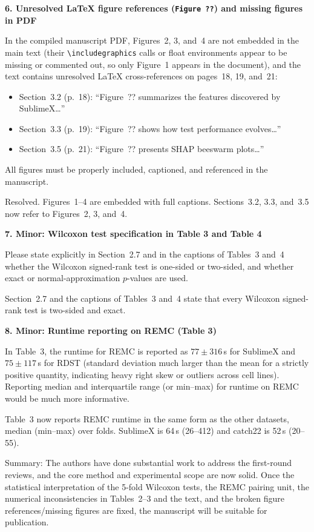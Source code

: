 \documentclass[11pt]{article}
\makeatletter
\newcommand{\rsp}{\par\vspace{0.9em}}
\newcommand{\rc}[1]{\begin{reviewerbox}#1\end{reviewerbox}}
\newcommand{\rcitem}[2]{\begin{reviewerbox}\textbf{#1}\par\smallskip#2\end{reviewerbox}}
\newcommand{\response}[2]{%
  \begin{responsebox}#1%
  \def\@responseitems{#2}%
  \ifx\@responseitems\empty\else\begin{itemize}[nosep,leftmargin=1.2em]#2\end{itemize}\fi
  \end{responsebox}\rsp}
\makeatother
\begin{document}
\rcitem{6. Unresolved LaTeX figure references (\texttt{Figure ??}) and missing figures in PDF}{In the compiled manuscript PDF, Figures~2, 3, and~4 are not embedded in the main text (their \texttt{\textbackslash includegraphics} calls or float environments appear to be missing or commented out, so only Figure~1 appears in the document), and the text contains unresolved LaTeX cross-references on pages~18, 19, and~21:
\begin{itemize}[nosep,leftmargin=1.4em]
  \item Section~3.2 (p.~18): ``Figure~?? summarizes the features discovered by SublimeX\ldots''
  \item Section~3.3 (p.~19): ``Figure~?? shows how test performance evolves\ldots''
  \item Section~3.5 (p.~21): ``Figure~?? presents SHAP beeswarm plots\ldots''
\end{itemize}
All figures must be properly included, captioned, and referenced in the manuscript.}

\response{Resolved. Figures~1--4 are embedded with full captions. Sections~3.2, 3.3, and~3.5 now refer to Figures~2, 3, and~4.}{}

\rcitem{7. Minor: Wilcoxon test specification in Table 3 and Table 4}{Please state explicitly in Section~2.7 and in the captions of Tables~3 and~4 whether the Wilcoxon signed-rank test is one-sided or two-sided, and whether exact or normal-approximation $p$-values are used.}

\response{Section~2.7 and the captions of Tables~3 and~4 state that every Wilcoxon signed-rank test is two-sided and exact.}{}

\rcitem{8. Minor: Runtime reporting on REMC (Table 3)}{In Table~3, the runtime for REMC is reported as $77 \pm 316$\,s for SublimeX and $75 \pm 117$\,s for RDST (standard deviation much larger than the mean for a strictly positive quantity, indicating heavy right skew or outliers across cell lines). Reporting median and interquartile range (or min--max) for runtime on REMC would be much more informative.}

\response{Table~3 now reports REMC runtime in the same form as the other datasets, median (min--max) over folds. SublimeX is 64\,s (26--412) and catch22 is 52\,s (20--55).}{}

\rc{Summary: The authors have done substantial work to address the first-round reviews, and the core method and experimental scope are now solid. Once the statistical interpretation of the 5-fold Wilcoxon tests, the REMC pairing unit, the numerical inconsistencies in Tables~2--3 and the text, and the broken figure references/missing figures are fixed, the manuscript will be suitable for publication.}
\end{document}
